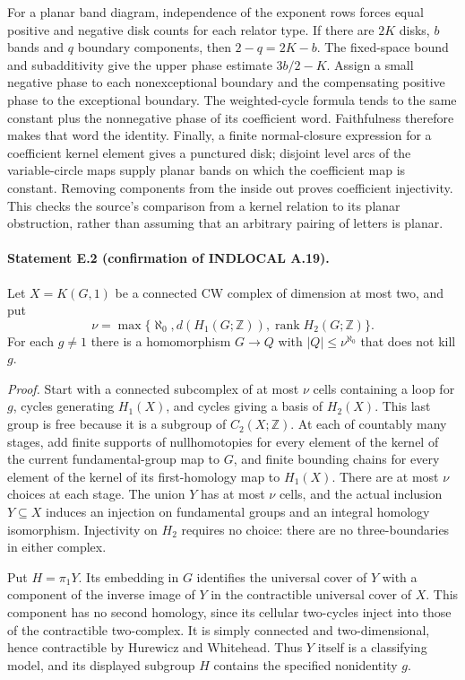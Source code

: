 For a planar band diagram, independence of the exponent rows forces
equal positive and negative disk counts for each relator type. If there
are $2K$ disks, $b$ bands and $q$ boundary components, then
$2-q=2K-b$. The fixed-space bound and subadditivity give the upper
phase estimate $3b/2-K$. Assign a small negative phase to each
nonexceptional boundary and the compensating positive phase to the
exceptional boundary. The weighted-cycle formula tends to the same
constant plus the nonnegative phase of its coefficient word. Faithfulness
therefore makes that word the identity. Finally, a finite normal-closure
expression for a coefficient kernel element gives a punctured disk;
disjoint level arcs of the variable-circle maps supply planar bands
on which the coefficient map is constant. Removing components from
the inside out proves coefficient injectivity. This checks the source's
comparison from a kernel relation to its planar obstruction, rather
than assuming that an arbitrary pairing of letters is planar.

\paragraph{Statement E.2 (confirmation of INDLOCAL A.19).}
Let $X=K(G,1)$ be a connected CW complex of dimension at most two, and put
\[
 \nu=\max\{\aleph_0,d(H_1(G;\mathbb Z)),
                          \operatorname{rank}H_2(G;\mathbb Z)\}.
\]
For each $g\ne1$ there is a homomorphism $G\to Q$ with
$|Q|\leq\nu^{\aleph_0}$ that does not kill $g$.

\emph{Proof.}
Start with a connected subcomplex of at most $\nu$ cells containing
a loop for $g$, cycles generating $H_1(X)$, and cycles giving a basis
of $H_2(X)$. This last group is free because it is a subgroup of
$C_2(X;\mathbb Z)$. At each of countably many stages, add finite
supports of nullhomotopies for every element of the kernel of the
current fundamental-group map to $G$, and finite bounding chains for
every element of the kernel of its first-homology map to $H_1(X)$.
There are at most $\nu$ choices at each stage. The union $Y$ has at
most $\nu$ cells, and the actual inclusion $Y\subseteq X$ induces
an injection on fundamental groups and an integral homology
isomorphism. Injectivity on $H_2$ requires no choice: there are no
three-boundaries in either complex.

Put $H=\pi_1Y$. Its embedding in $G$ identifies the universal cover
of $Y$ with a component of the inverse image of $Y$ in the
contractible universal cover of $X$. This component has no second
homology, since its cellular two-cycles inject into those of the
contractible two-complex. It is simply connected and
two-dimensional, hence contractible by Hurewicz and Whitehead.
Thus $Y$ itself is a classifying model, and its displayed subgroup
$H$ contains the specified nonidentity $g$.

